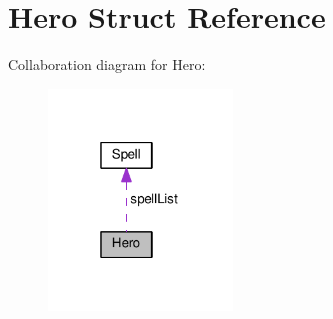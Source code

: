 \hypertarget{structHero}{}\section{Hero Struct Reference}
\label{structHero}


Collaboration diagram for Hero\+:
\nopagebreak
\begin{figure}[H]
\begin{center}
\leavevmode
\includegraphics[width=139pt]{structHero__coll__graph}
\end{center}
\end{figure}

